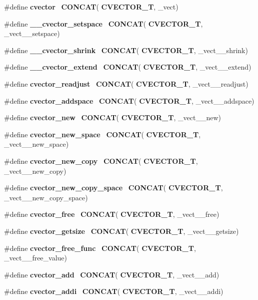 \begin{DoxyCompactItemize}
\#define \textbf{ cvector}~\textbf{ C\+O\+N\+C\+AT}(\textbf{ C\+V\+E\+C\+T\+O\+R\+\_\+T}, \+\_\+vect)
\item 
\#define \textbf{ \+\_\+\+\_\+cvector\+\_\+setspace}~\textbf{ C\+O\+N\+C\+AT}(\textbf{ C\+V\+E\+C\+T\+O\+R\+\_\+T}, \+\_\+vect\+\_\+\+\_\+setspace)
\item 
\#define \textbf{ \+\_\+\+\_\+cvector\+\_\+shrink}~\textbf{ C\+O\+N\+C\+AT}(\textbf{ C\+V\+E\+C\+T\+O\+R\+\_\+T}, \+\_\+vect\+\_\+\+\_\+shrink)
\item 
\#define \textbf{ \+\_\+\+\_\+cvector\+\_\+extend}~\textbf{ C\+O\+N\+C\+AT}(\textbf{ C\+V\+E\+C\+T\+O\+R\+\_\+T}, \+\_\+vect\+\_\+\+\_\+extend)
\item 
\#define \textbf{ cvector\+\_\+readjust}~\textbf{ C\+O\+N\+C\+AT}(\textbf{ C\+V\+E\+C\+T\+O\+R\+\_\+T}, \+\_\+vect\+\_\+\+\_\+readjust)
\item 
\#define \textbf{ cvector\+\_\+addspace}~\textbf{ C\+O\+N\+C\+AT}(\textbf{ C\+V\+E\+C\+T\+O\+R\+\_\+T}, \+\_\+vect\+\_\+\+\_\+addspace)
\item 
\#define \textbf{ cvector\+\_\+new}~\textbf{ C\+O\+N\+C\+AT}(\textbf{ C\+V\+E\+C\+T\+O\+R\+\_\+T}, \+\_\+vect\+\_\+\+\_\+new)
\item 
\#define \textbf{ cvector\+\_\+new\+\_\+space}~\textbf{ C\+O\+N\+C\+AT}(\textbf{ C\+V\+E\+C\+T\+O\+R\+\_\+T}, \+\_\+vect\+\_\+\+\_\+new\+\_\+space)
\item 
\#define \textbf{ cvector\+\_\+new\+\_\+copy}~\textbf{ C\+O\+N\+C\+AT}(\textbf{ C\+V\+E\+C\+T\+O\+R\+\_\+T}, \+\_\+vect\+\_\+\+\_\+new\+\_\+copy)
\item 
\#define \textbf{ cvector\+\_\+new\+\_\+copy\+\_\+space}~\textbf{ C\+O\+N\+C\+AT}(\textbf{ C\+V\+E\+C\+T\+O\+R\+\_\+T}, \+\_\+vect\+\_\+\+\_\+new\+\_\+copy\+\_\+space)
\item 
\#define \textbf{ cvector\+\_\+free}~\textbf{ C\+O\+N\+C\+AT}(\textbf{ C\+V\+E\+C\+T\+O\+R\+\_\+T}, \+\_\+vect\+\_\+\+\_\+free)
\item 
\#define \textbf{ cvector\+\_\+getsize}~\textbf{ C\+O\+N\+C\+AT}(\textbf{ C\+V\+E\+C\+T\+O\+R\+\_\+T}, \+\_\+vect\+\_\+\+\_\+getsize)
\item 
\#define \textbf{ cvector\+\_\+free\+\_\+func}~\textbf{ C\+O\+N\+C\+AT}(\textbf{ C\+V\+E\+C\+T\+O\+R\+\_\+T}, \+\_\+vect\+\_\+\+\_\+free\+\_\+value)
\item 
\#define \textbf{ cvector\+\_\+add}~\textbf{ C\+O\+N\+C\+AT}(\textbf{ C\+V\+E\+C\+T\+O\+R\+\_\+T}, \+\_\+vect\+\_\+\+\_\+add)
\item 
\#define \textbf{ cvector\+\_\+addi}~\textbf{ C\+O\+N\+C\+AT}(\textbf{ C\+V\+E\+C\+T\+O\+R\+\_\+T}, \+\_\+vect\+\_\+\+\_\+addi)

\end{DoxyCompactItemize}

